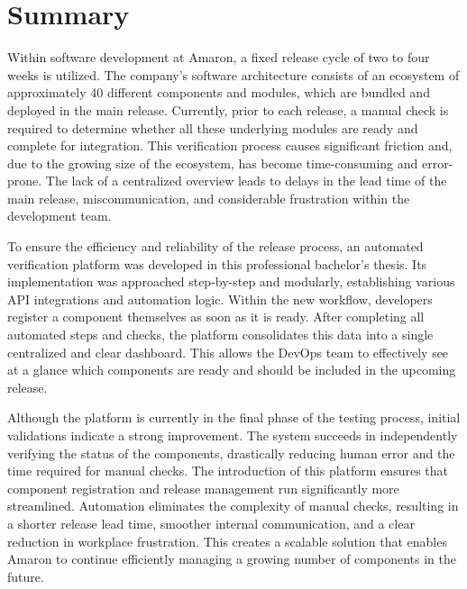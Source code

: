 \cleardoublepage
\chapter*{Summary}

Within software development at Amaron, a fixed release cycle of two to four weeks is utilized. The company's software architecture consists of an ecosystem of approximately 40 different components and modules, which are bundled and deployed in the main release. Currently, prior to each release, a manual check is required to determine whether all these underlying modules are ready and complete for integration. This verification process causes significant friction and, due to the growing size of the ecosystem, has become time-consuming and error-prone. The lack of a centralized overview leads to delays in the lead time of the main release, miscommunication, and considerable frustration within the development team.

To ensure the efficiency and reliability of the release process, an automated verification platform was developed in this professional bachelor's thesis. Its implementation was approached step-by-step and modularly, establishing various API integrations and automation logic. Within the new workflow, developers register a component themselves as soon as it is ready. After completing all automated steps and checks, the platform consolidates this data into a single centralized and clear dashboard. This allows the DevOps team to effectively see at a glance which components are ready and should be included in the upcoming release.

Although the platform is currently in the final phase of the testing process, initial validations indicate a strong improvement. The system succeeds in independently verifying the status of the components, drastically reducing human error and the time required for manual checks. The introduction of this platform ensures that component registration and release management run significantly more streamlined. Automation eliminates the complexity of manual checks, resulting in a shorter release lead time, smoother internal communication, and a clear reduction in workplace frustration. This creates a scalable solution that enables Amaron to continue efficiently managing a growing number of components in the future.
